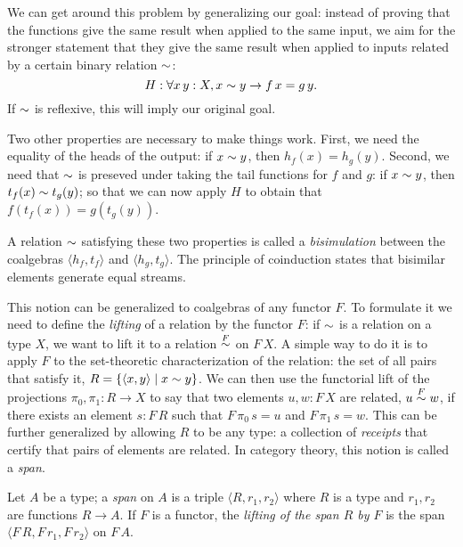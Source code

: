 We can get around this problem by generalizing our goal: instead of proving that the functions give the same result when applied to the same input, we aim for the stronger statement that they give the same result when applied to inputs related by a certain binary relation $\sim$:
$$
H: \forall x\, y:X, x\sim y \rightarrow f\,x = g\,y.
$$
If $\sim$ is reflexive, this will imply our original goal.

Two other properties are necessary to make things work.
First, we need the equality of the heads of the output: if $x\sim y$, then $h_f(x) = h_g(y)$.
Second, we need that $\sim$ is preseved under taking the tail functions for $f$ and $g$: if $x\sim y$, then $t_f(x) \sim t_g(y)$; so that we can now apply $H$ to obtain that $f(t_f(x)) = g(t_g(y))$.

A relation $\sim$ satisfying these two properties is called a {\em bisimulation} between the coalgebras $\langle h_f, t_f\rangle$ and $\langle h_g, t_g\rangle$.
The principle of coinduction states that bisimilar elements generate equal streams.

This notion can be generalized to coalgebras of any functor $F$.
To formulate it we need to define the {\em lifting} of a relation by the functor $F$: if $\sim$ is a relation on a type $X$, we want to lift it to a relation $\mathrel{\stackrel{F}{\sim}}$ on $F\,X$.
A simple way to do it is to apply $F$ to the set-theoretic characterization of the relation: the set of all pairs that satisfy it, $R = \{ \langle x, y \rangle \mid x \sim y\}$.
We can then use the functorial lift of the projections $\pi_0, \pi_1:R \rightarrow X$ to say that two elements $u,w:F\,X$ are related, $u \mathrel{\stackrel{F}{\sim}} w$, if there exists an element $s:F\,R$ such that $F\,\pi_0\,s = u$ and $F\,\pi_1\,s = w$.
This can be further generalized by allowing $R$ to be any type: a collection of {\em receipts} that certify that pairs of elements are related.
In category theory, this notion is called a {\em span}.

\begin{definition}\label{def:span}
Let $A$ be a type; a {\em span} on $A$ is a triple $\langle R,r_1,r_2\rangle$ where $R$ is a type and $r_1, r_2$ are functions $R\rightarrow A$.
If $F$ is a functor, the {\em lifting of the span $R$ by $F$} is the span $\langle F\,R,F\,r_1,F\,r_2\rangle$ on $F\,A$.
\end{definition}

